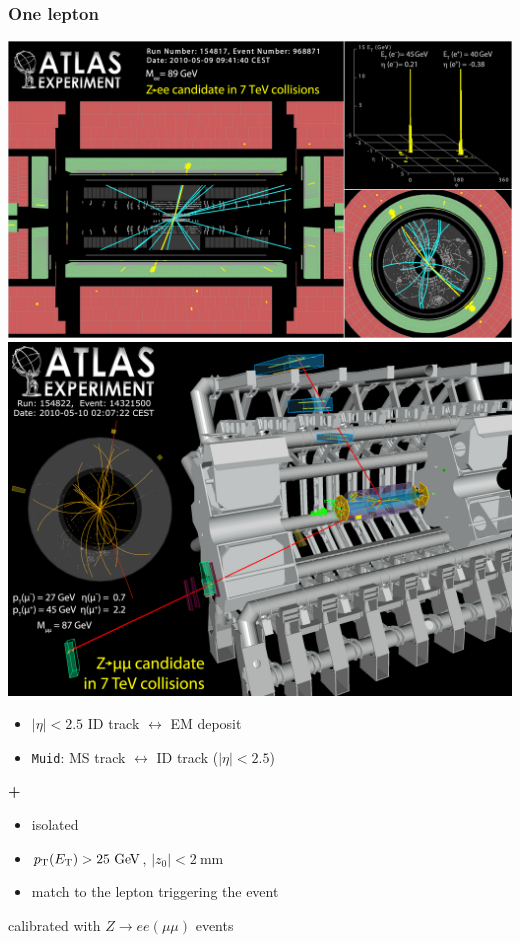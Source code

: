 \begin{frame}\frametitle{One lepton}
\footnotesize\centering

\includegraphics[width=.5\textwidth,height=0.5\textheight]{pics/Zee}
\includegraphics[width=.5\textwidth,height=0.5\textheight]{pics/Zmumu}

\begin{minipage}{.5\textwidth}\centering

\begin{itemize}
\item $|\eta|<2.5$ ID track $\leftrightarrow$ EM deposit
\end{itemize}

\end{minipage}\begin{minipage}{.5\textwidth}\centering

\begin{itemize}
\item \texttt{Muid}: MS track $\leftrightarrow$ ID track ($|\eta|<2.5$)
\end{itemize}

\end{minipage}

\begin{minipage}{.5\textwidth}\centering

{\cccolor \bfseries \large +}\\
\begin{itemize}
\item isolated
\item $\pt (\et) > 25\gev$, $|z_0|<2~$mm
\item match to the lepton triggering the event
\end{itemize}
\end{minipage}

\myskip
calibrated with $Z\to ee (\mu\mu)$ events

\end{frame}



